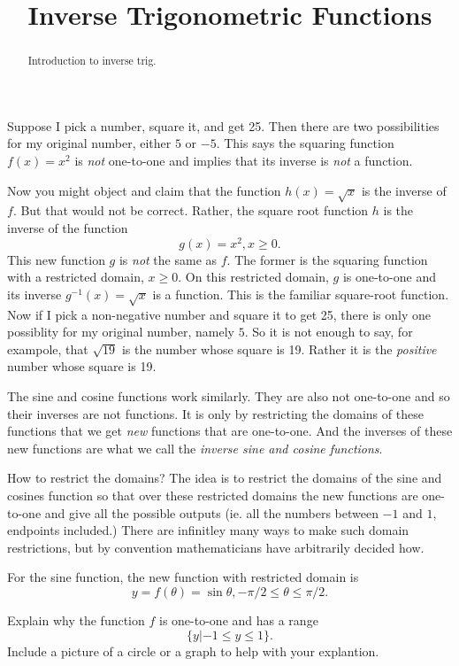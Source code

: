 \documentclass{ximera}
\title{Inverse Trigonometric Functions}
\begin{document}
\begin{abstract}
Introduction to inverse trig.
\end{abstract}
\maketitle

Suppose I pick a number, square it, and get 25. Then there are two possibilities for my original number, either $5$ or $-5$. This says the squaring function $f(x)=x^2$ is \emph{not} one-to-one and implies that its inverse is \emph{not} a function. 

Now you might object and claim that the function $h(x)=\sqrt{x}$ is the inverse of $f$. But that would not be correct. Rather, the square root function $h$ is the inverse of the  function
\[
    g(x) = x^2 , x\geq 0 .
\]
This new function $g$ is \emph{not} the same as $f$. The former is the squaring function with a restricted domain, $x\geq 0$. On this restricted domain, $g$ is one-to-one and its inverse $g^{-1}(x) = \sqrt{x}$ is a function. This is the familiar square-root function. Now if I pick a non-negative number and square it to get 25, there is only one possiblity for my original number, namely $5$. So it is not enough to say, for exampole, that $\sqrt{19}$ is the number whose square is 19. Rather it is the \emph{positive} number whose square is 19.

The sine and cosine functions work similarly. They are also not one-to-one and so their inverses are not functions. It is only by restricting the domains of these functions that we get \emph{new} functions that are one-to-one. And the inverses of these new functions are what we call the \emph{inverse sine and cosine functions}.

How to restrict the domains? The idea is to restrict the domains of the sine and cosines function so that over these restricted domains the new functions are one-to-one and give all the possible outputs (ie. all the numbers between $-1$ and $1$, endpoints included.) There are infinitley many ways to make such domain restrictions, but by convention mathematicians have arbitrarily decided how.

For the sine function, the new function with restricted domain is 
\[
    y  = f(\theta) = \sin \theta , -\pi/2 \leq \theta \leq \pi/2 . 
\]

\begin{question}  \label{Q1:Inverse}
Explain why the function $f$ is one-to-one and has a range 
\[
   \{y | -1 \leq y \leq 1\}. 
\]
Include a picture of a circle or a graph to help with your explantion.
\end{question}
\end{document}

